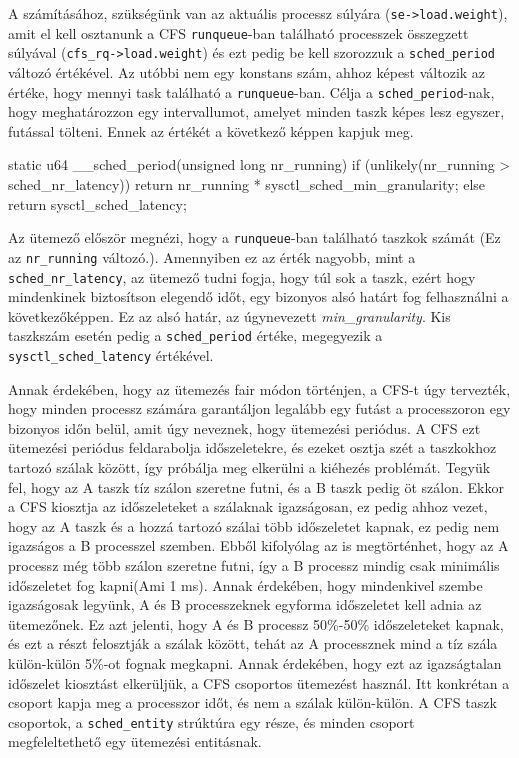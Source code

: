 A számításához, szükségünk van az aktuális processz súlyára (\texttt{se->load.weight}), amit el kell osztanunk a CFS \texttt{runqueue}-ban található processzek összegzett súlyával (\texttt{cfs\_rq->load.weight}) és ezt pedig be kell szorozzuk a \texttt{sched\_period} változó értékével. Az utóbbi nem egy konstans szám, ahhoz képest változik az értéke, hogy mennyi task található a \texttt{runqueue}-ban. Célja a \texttt{sched\_period}-nak, hogy meghatározzon egy intervallumot, amelyet minden taszk képes lesz egyszer, futással tölteni.
Ennek az értékét a következő képpen kapjuk meg.

\begin{cpp}
static u64 __sched_period(unsigned long nr_running)
{
    if (unlikely(nr_running > sched_nr_latency))
        return nr_running * sysctl_sched_min_granularity;
    else
        return sysctl_sched_latency;
}
\end{cpp}

Az ütemező először megnézi, hogy a \texttt{runqueue}-ban található taszkok számát (Ez az \texttt{nr\_running} változó.). 
Amennyiben ez az érték nagyobb, mint a \texttt{sched\_nr\_latency}, az ütemező tudni fogja, hogy túl sok a taszk, ezért hogy mindenkinek biztosítson elegendő időt, egy bizonyos alsó határt fog felhasználni a következőképpen. Ez az alsó határ, az úgynevezett \textit{min\_granularity}. Kis taszkszám esetén pedig a \texttt{sched\_period} értéke, megegyezik a  \texttt{sysctl\_sched\_latency} értékével.


Annak érdekében, hogy az ütemezés fair módon történjen, a CFS-t úgy tervezték, hogy minden processz számára garantáljon legalább egy futást a processzoron egy bizonyos időn belül, amit úgy neveznek, hogy ütemezési periódus.
A CFS ezt ütemezési periódus feldarabolja időszeletekre, és ezeket osztja szét a taszkokhoz tartozó szálak között, így próbálja meg elkerülni a kiéhezés problémát. 
Tegyük fel, hogy az A taszk tíz szálon szeretne futni, és a B taszk pedig öt szálon. Ekkor a CFS kiosztja az időszeleteket a szálaknak igazságosan, ez pedig ahhoz vezet, hogy az A taszk és a hozzá tartozó szálai több időszeletet kapnak, ez pedig nem igazságos a B processzel szemben.
Ebből kifolyólag az is megtörténhet, hogy az A processz még több szálon szeretne futni, így a B processz mindig csak minimális időszeletet fog kapni(Ami 1 ms). Annak érdekében, hogy mindenkivel szembe igazságosak legyünk, A és B processzeknek egyforma időszeletet kell adnia az ütemezőnek. Ez azt jelenti, hogy A és B processz 50\%-50\% időszeleteket kapnak, és ezt a részt felosztják a szálak között, tehát az A processznek mind a tíz szála külön-külön 5\%-ot fognak megkapni.
Annak érdekében, hogy ezt az igazságtalan időszelet kiosztást elkerüljük, a CFS csoportos ütemezést használ. Itt konkrétan a csoport kapja meg a processzor időt, és nem a szálak külön-külön.
A CFS taszk csoportok, a \texttt{sched\_entity} strúktúra egy része, és minden csoport megfeleltethető egy ütemezési entitásnak.

